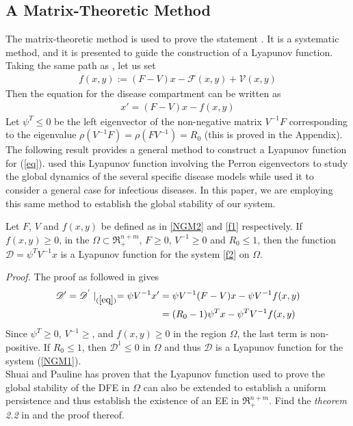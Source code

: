 \subsection{A Matrix-Theoretic Method}
The matrix-theoretic method is used to prove the statement \parencite{shuai2013global}. It is a systematic method, and it is presented to guide the construction of a Lyapunov function. Taking the same path as \parencite{shuai2013global,castillo2002computation,van2008further}, let us set 
\begin{align}
f(x,y) := (F - V)x - \mathscr{F}(x,y) + \mathscr{V}(x,y) \label{f1}
\end{align}
Then the equation for the disease compartment can be written as 
\begin{align}
x' = (F - V)x - f(x,y) \label{f2}
\end{align}
Let $\psi^{T} \leq 0$ be the left eigenvector of the non-negative matrix $ V^{-1}F $ corresponding to the eigenvalue $ \rho(V^{-1}F) = \rho(FV^{-1}) = R_{0} $ (this is proved in the Appendix). The following result provides a general method to construct a Lyapunov function for (\ref{eq}). \cite{guo2011global,guo2008graph,shuai2011global} used this Lyapunov function involving the Perron eigenvectors to study the global dynamics of the  several specific disease models while \parencite{shuai2013global} used it to consider a general case for infectious diseases. In this paper, we are employing this same method to establish the global stability of our system. 
\begin{theorem}
	Let $ F $, $ V $ and $ f(x,y) $ be defined as in \ref{NGM2} and \ref{f1} respectively. If $ f(x,y) \geq 0 $, in the  $ \Omega \subset \Re_{+}^{n+m} $, $ F \geq 0 $, $ V^{-1} \geq 0 $ and $ R_{0} \leq 1 $, then the function $ \mathscr{D} = \psi^{T} V^{-1}x $ is a Lyapunov function for the system \ref{f2} on $ \Omega $.
\end{theorem}
\textit{Proof.} The proof as followed in \parencite{shuai2013global} gives
\begin{align}
\mathscr{D'} = \mathscr{D}^{'}\mid_{(\ref{eq})} = \psi V^{-1}x' &= \psi V^{-1}(F - V)x -\psi V^{-1}f(x,y)\label{f3}\\
&= (R_{0} - 1)\psi^{T} x - \psi^{T} V^{-1}f(x,y)\label{f4}
\end{align}
Since $ \psi^{T} \geq 0 $, $ V^{-1} \geq $, and $ f(x,y) \geq 0$ in the region $ \Omega $, the last term is non-positive. If $ R_{0} \leq 1 $, then $ \mathscr{D}^{1} \leq 0 $  in $ \Omega $ and thus $ \mathscr{D} $ is a Lyapunov function for the system (\ref{NGM1}).\\
Shuai and Pauline \parencite{shuai2013global} has proven that the Lyapunov function used to prove the global stability of the DFE in $ \Omega $ can also be extended to establish a uniform persistence and thus establish the existence of an EE in $ \Re_{+}^{n+m} $. Find the \textit{theorem 2.2} in \parencite{shuai2013global} and the proof thereof. 
